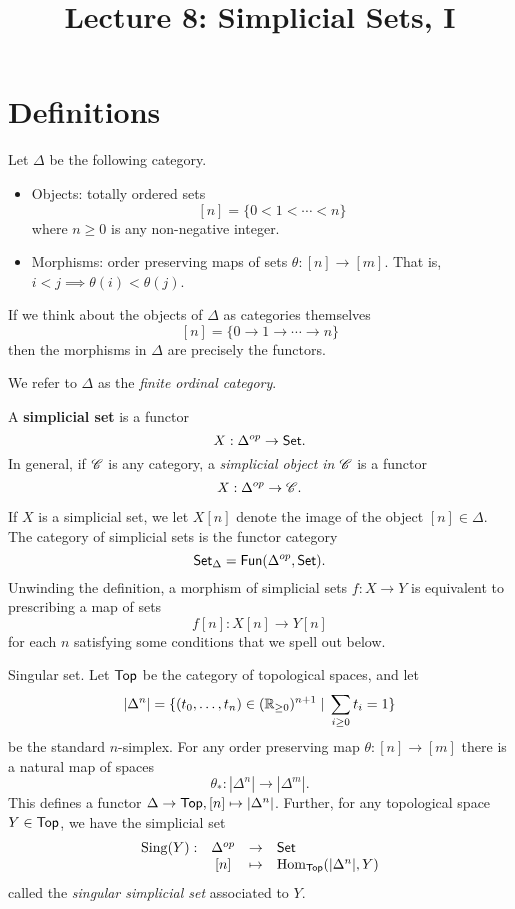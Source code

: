 \documentclass[11pt]{amsart}
\title{Lecture 8: Simplicial Sets, I}
\def\Fun{{\sf Fun}}
\def\Top{{\sf Top}}
\begin{document}
\maketitle
\section{Definitions}

Let $\Delta$ be the following category. 
\begin{itemize}
\item Objects: totally ordered sets
\[
[n] = \{0 < 1 < \cdots < n\}
\]
where $n \geq 0$ is any non-negative integer.

\item Morphisms: order preserving maps of sets $\theta : [n] \to [m]$. 
That is, $i < j \implies \theta(i) < \theta(j)$. 
\end{itemize}

\begin{rmk}
If we think about the objects of $\Delta$ as categories themselves
\[
[n] = \{0 \to 1 \to \cdots \to n\}
\]
then the morphisms in $\Delta$ are precisely the functors. 
\end{rmk}

We refer to $\Delta$ as the {\em finite ordinal category}. 

\begin{dfn}
A {\bf simplicial set} is a functor
\[
X : \Delta^{op} \to {\sf Set} .
\]
In general, if $\mathscr C$ is any category, a {\em simplicial object in $\mathscr C$} is a functor 
\[
X : \Delta^{op} \to \mathscr C .
\]
\end{dfn}

If $X$ is a simplicial set, we let $X[n]$ denote the image of the object $[n] \in \Delta$. 
The category of simplicial sets is the functor category
\[
\Set_{\Delta} = \Fun(\Delta^{op}, \Set) .
\]
Unwinding the definition, a morphism of simplicial sets $f : X \to Y$ is equivalent to prescribing a map of sets
\[
f[n] : X[n] \to Y[n]
\]
for each $n$ satisfying some conditions that we spell out below.

\begin{eg}\label{eg: sing}
Singular set.
Let $\Top$ be the category of topological spaces, and let
\[
|\Delta^n| = \{(t_0,\ldots,t_n) \in (\mathbb R_{\geq 0})^{n+1} \; | \; \sum_{i\geq 0} t_i = 1\}
\]
be the standard $n$-simplex. 
For any order preserving map $\theta : [n] \to [m]$ there is a natural map of spaces
\[
\theta_* : |\Delta^n| \to |\Delta^m| .
\]
This defines a functor $\Delta \to \Top, [n] \mapsto |\Delta^n|$. 
Further, for any topological space $Y \in \Top$, we have the simplicial set
\[
\begin{array}{cccl}
{\rm Sing} (Y) : & \Delta^{op} & \to & \Set \\
& [n] & \mapsto & \Hom_{\Top}(|\Delta^n|, Y)
\end{array}
\]
called the {\em singular simplicial set} associated to $Y$. 
\end{eg}
\end{document}
